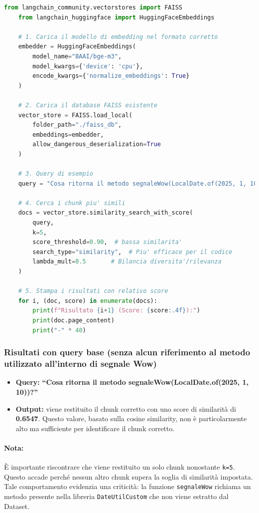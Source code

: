 \documentclass[12pt,a4paper,openright,twoside]{book}
\begin{document}
    \begin{lstlisting}[language=Python, caption={Esecuzione di una query sul database FAISS}, label={lst:query}]
    from langchain_community.vectorstores import FAISS
    from langchain_huggingface import HuggingFaceEmbeddings

    # 1. Carica il modello di embedding nel formato corretto
    embedder = HuggingFaceEmbeddings(
        model_name="BAAI/bge-m3",
        model_kwargs={'device': 'cpu'},
        encode_kwargs={'normalize_embeddings': True}
    )

    # 2. Carica il database FAISS esistente
    vector_store = FAISS.load_local(
        folder_path="./faiss_db",
        embeddings=embedder,
        allow_dangerous_deserialization=True
    )

    # 3. Query di esempio
    query = "Cosa ritorna il metodo segnaleWow(LocalDate.of(2025, 1, 10))?"

    # 4. Cerca i chunk piu' simili
    docs = vector_store.similarity_search_with_score(
        query,
        k=5,
        score_threshold=0.90,  # bassa similarita'
        search_type="similarity",  # Piu' efficace per il codice
        lambda_mult=0.5       # Bilancia diversita'/rilevanza
    )

    # 5. Stampa i risultati con relativo score
    for i, (doc, score) in enumerate(docs):
        print(f"Risultato {i+1} (Score: {score:.4f}):")
        print(doc.page_content)
        print("-" * 40)
    \end{lstlisting}

    \subsubsection{Risultati con query base (senza alcun riferimento al metodo utilizzato all'interno di segnale Wow)}
    \begin{itemize}
        \item \textbf{Query:} 
            \newline
                \textbf{``Cosa ritorna il metodo segnaleWow(LocalDate.of(2025, 1, 10))?''}
            \newline
        \item \textbf{Output:}
        viene restituito il chunk corretto con uno score di similarità di \textbf{0.6547}. Questo valore, basato sulla cosine similarity, non è particolarmente alto ma sufficiente per identificare il chunk corretto.
    \end{itemize}
    \paragraph{Nota:}
    È importante riscontrare che viene restituito un solo chunk nonostante \texttt{k=5}.
    Questo accade perché nessun altro chunk supera la soglia di similarità impostata.
    Tale comportamento evidenzia una criticità: la funzione \texttt{segnaleWow} richiama un metodo presente nella libreria \texttt{DateUtilCustom} che non viene estratto dal Dataset.
\end{document}
